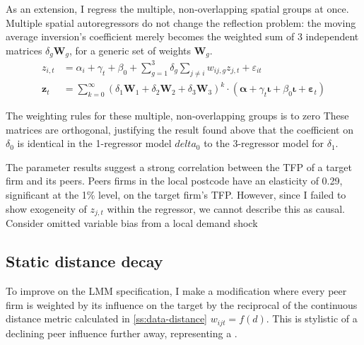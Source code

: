 \newpage
\par
As an extension, I regress the multiple, non-overlapping spatial groups at once.
Multiple spatial autoregressors do not change the reflection problem:
the moving average inversion's coefficient merely becomes the weighted sum
of 3 independent matrices $\delta_g \mathbf W_g$, for a generic set of weights $\mathbf W_g$.
\begin{align}
    \label{eq:lmm-structural1}
    z_{i,t} &= \alpha_i + \gamma_t + \beta_0
                + \sum_{g=1}^3 \delta_g \sum_{j\neq i} w_{ij,g}z_{j,t}
                + \varepsilon_{it}
    \\
    \mathbf z_t &= \sum_{k=0}^\infty (\delta_1 \mathbf W_1 + \delta_2 \mathbf W_2 + \delta_3 \mathbf W_3)^k \cdot
        (\boldsymbol\alpha + \gamma_t \boldsymbol\iota + \beta_0\boldsymbol\iota + \boldsymbol\varepsilon_t)
\end{align}

The weighting rules for these multiple, non-overlapping groups is to zero 
These matrices are orthogonal, justifying the result found above that the coefficient on $\delta_0$
is identical in the 1-regressor model $delta_0$ to the 3-regressor model for $\delta_1$.

The parameter results suggest a strong correlation between the TFP of a target firm and its peers.
Peers firms in the local postcode have an elasticity of 0.29,
significant at the 1\% level, on the target firm's TFP.
However, since I failed to show exogeneity of $z_{j,t}$ within the regressor,
we cannot describe this as causal. Consider omitted variable bias from a local demand shock 


\newpage
\subsection{Static distance decay}
\label{ss:model-dd}

To improve on the LMM specification, I make a modification where
every peer firm is weighted by its influence on the target by the reciprocal of the 
continuous distance metric calculated in \ref{ss:data-distance}
$w_{ijt}=f(d)$. This is stylistic of a declining peer influence further away,
representing a .

